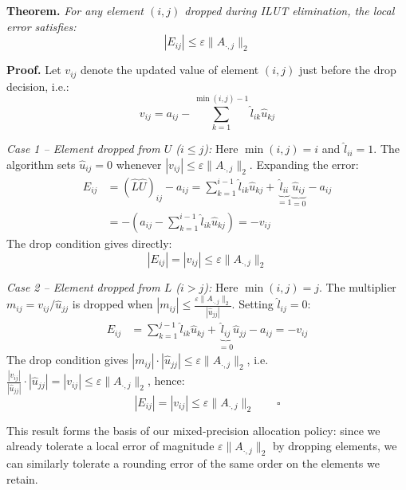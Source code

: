 \documentclass[11pt,a4paper]{article}
\begin{document}
\textbf{Theorem.} \textit{For any element $(i,j)$ dropped during ILUT elimination, the local error satisfies:}
\begin{equation}
    |E_{ij}| \le \varepsilon \|A_{\cdot,j}\|_2
\end{equation}

\textbf{Proof.} Let $v_{ij}$ denote the updated value of element $(i,j)$ just before the drop decision, i.e.:
\begin{equation}
    v_{ij} = a_{ij} - \sum_{k=1}^{\min(i,j)-1} \hat{l}_{ik}\hat{u}_{kj}
\end{equation}

\textit{Case 1 -- Element dropped from $U$ ($i \le j$):} Here $\min(i,j) = i$ and $\hat{l}_{ii} = 1$. The algorithm sets $\hat{u}_{ij} = 0$ whenever $|v_{ij}| \le \varepsilon\|A_{\cdot,j}\|_2$. Expanding the error:
\begin{align}
    E_{ij} &= (\hat{L}\hat{U})_{ij} - a_{ij} = \sum_{k=1}^{i-1}\hat{l}_{ik}\hat{u}_{kj} + \underbrace{\hat{l}_{ii}}_{=1}\underbrace{\hat{u}_{ij}}_{=0} - a_{ij} \\
    &= -\left(a_{ij} - \sum_{k=1}^{i-1}\hat{l}_{ik}\hat{u}_{kj}\right) = -v_{ij}
\end{align}
The drop condition gives directly:
\begin{equation}
    |E_{ij}| = |v_{ij}| \le \varepsilon\|A_{\cdot,j}\|_2
\end{equation}

\textit{Case 2 -- Element dropped from $L$ ($i > j$):} Here $\min(i,j) = j$. The multiplier $m_{ij} = v_{ij}/\hat{u}_{jj}$ is dropped when $|m_{ij}| \le \frac{\varepsilon\|A_{\cdot,j}\|_2}{|\hat{u}_{jj}|}$. Setting $\hat{l}_{ij} = 0$:
\begin{align}
    E_{ij} &= \sum_{k=1}^{j-1}\hat{l}_{ik}\hat{u}_{kj} + \underbrace{\hat{l}_{ij}}_{=0}\hat{u}_{jj} - a_{ij} = -v_{ij}
\end{align}
The drop condition gives $|m_{ij}|\cdot|\hat{u}_{jj}| \le \varepsilon\|A_{\cdot,j}\|_2$, i.e. $\frac{|v_{ij}|}{|\hat{u}_{jj}|}\cdot|\hat{u}_{jj}| = |v_{ij}| \le \varepsilon\|A_{\cdot,j}\|_2$, hence:
\begin{equation}
    |E_{ij}| = |v_{ij}| \le \varepsilon\|A_{\cdot,j}\|_2 \qquad \square
\end{equation}

This result forms the basis of our mixed-precision allocation policy: since we already tolerate a local error of magnitude $\varepsilon\|A_{\cdot,j}\|_2$ by dropping elements, we can similarly tolerate a rounding error of the same order on the elements we retain.
\end{document}
